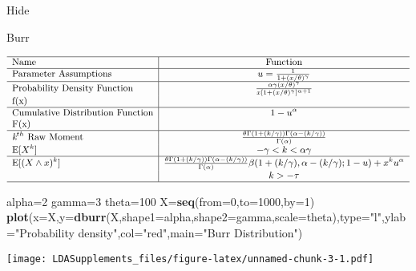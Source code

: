 \documentclass[]{book}
\newenvironment{Shaded}{\begin{snugshade}}{\end{snugshade}}
\newcommand{\KeywordTok}[1]{\textcolor[rgb]{0.13,0.29,0.53}{\textbf{#1}}}
\newcommand{\DataTypeTok}[1]{\textcolor[rgb]{0.13,0.29,0.53}{#1}}
\newcommand{\DecValTok}[1]{\textcolor[rgb]{0.00,0.00,0.81}{#1}}
\newcommand{\StringTok}[1]{\textcolor[rgb]{0.31,0.60,0.02}{#1}}
\newcommand{\NormalTok}[1]{#1}
\begin{document}
\hypertarget{3pB}{}
{Hide}

Burr

\[
{\small
\begin{matrix}
\begin{array}{l|c}
\hline
  \text{Name} & \text{Function} \\
\hline
  \text{Parameter Assumptions} & u=\frac{1}{1+(x/\theta)^\gamma} \\
\hline
  \text{Probability Density Function} & \frac{\alpha\gamma(x/\theta)^\gamma}{x[1+(x/\theta)^\gamma]^{\alpha+1}} \\
    \text{f(x)} & \\
\hline
  \text{Cumulative Distribution Function} & 1-u^\alpha \\
    \text{F(x)} & \\
\hline
  \textit{k}^{th}~\text{Raw Moment} & \frac{\theta\Gamma(1+(k/\gamma))\Gamma(\alpha-(k/\gamma))}{\Gamma(\alpha)} \\
  \mathrm{E}[X^k]  & -\gamma<k<\alpha\gamma \\
\hline
  \mathrm{E}[(X\wedge x)^k] & \frac{\theta\Gamma(1+(k/\gamma))\Gamma(\alpha-(k/\gamma))}{\Gamma(\alpha)}\beta(1+(k/\gamma),\alpha-(k/\gamma);1-u)+x^ku^\alpha  \\
  & k>-\tau \\
\hline
\end{array}
\end{matrix}
}
\]

\begin{Shaded}
\begin{Highlighting}[]
\NormalTok{alpha=}\DecValTok{2}
\NormalTok{gamma=}\DecValTok{3}
\NormalTok{theta=}\DecValTok{100}
\NormalTok{X=}\KeywordTok{seq}\NormalTok{(}\DataTypeTok{from=}\DecValTok{0}\NormalTok{,}\DataTypeTok{to=}\DecValTok{1000}\NormalTok{,}\DataTypeTok{by=}\DecValTok{1}\NormalTok{)}
\KeywordTok{plot}\NormalTok{(}\DataTypeTok{x=}\NormalTok{X,}\DataTypeTok{y=}\KeywordTok{dburr}\NormalTok{(X,}\DataTypeTok{shape1=}\NormalTok{alpha,}\DataTypeTok{shape2=}\NormalTok{gamma,}\DataTypeTok{scale=}\NormalTok{theta),}\DataTypeTok{type=}\StringTok{"l"}\NormalTok{,}\DataTypeTok{ylab=}\StringTok{"Probability density"}\NormalTok{,}\DataTypeTok{col=}\StringTok{"red"}\NormalTok{,}\DataTypeTok{main=}\StringTok{"Burr Distribution"}\NormalTok{)}
\end{Highlighting}
\end{Shaded}

\texttt{[image: LDASupplements\_files/figure-latex/unnamed-chunk-3-1.pdf]}
\end{document}
